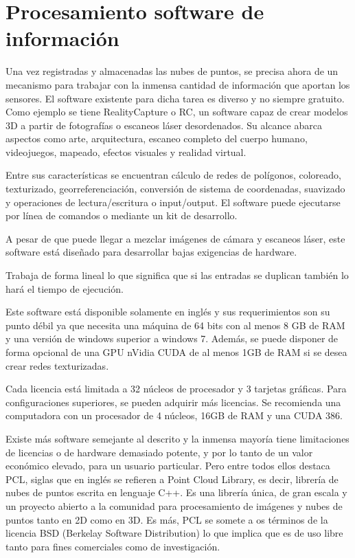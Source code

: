 \section{Procesamiento software de información } \label{librerias}

Una vez registradas y almacenadas las nubes de puntos, se precisa ahora de un mecanismo para trabajar con la inmensa cantidad de información que aportan los sensores. El software existente para dicha tarea es diverso y no siempre gratuito. Como ejemplo se tiene RealityCapture o RC, un software capaz de crear modelos 3D a partir de fotografías o escaneos láser desordenados. Su alcance abarca aspectos como arte, arquitectura, escaneo completo del cuerpo humano, videojuegos, mapeado, efectos visuales y realidad virtual.

Entre sus características se encuentran cálculo de redes de polígonos, coloreado, texturizado, georreferenciación, conversión de sistema de coordenadas, suavizado y operaciones de lectura/escritura o input/output.
El software puede ejecutarse por línea de comandos o mediante un kit de desarrollo.

A pesar de que puede llegar a mezclar imágenes de cámara y escaneos láser, este software está diseñado para desarrollar bajas exigencias de hardware. 

Trabaja de forma lineal lo que significa que si las entradas se duplican también lo hará el tiempo de ejecución.

Este software está disponible solamente en inglés y sus requerimientos son su punto débil ya que necesita una máquina de 64 bits con al menos 8 GB de RAM y una versión de windows superior a windows 7. Además, se puede disponer de forma opcional de una GPU nVidia CUDA de al menos 1GB de RAM si se desea crear redes texturizadas.

Cada licencia está limitada a 32 núcleos de procesador y 3 tarjetas gráficas. Para configuraciones superiores, se pueden adquirir más licencias. Se recomienda una computadora con un procesador de 4 núcleos, 16GB de RAM y una CUDA 386.



Existe más software semejante al descrito y la inmensa mayoría tiene limitaciones de licencias o de hardware demasiado potente, y por lo tanto de un valor económico elevado, para un usuario particular. Pero entre todos ellos destaca PCL, siglas que en inglés se refieren a Point Cloud Library, es decir, librería de nubes de puntos escrita en lenguaje C++. Es una librería única, de gran escala y un proyecto abierto a la comunidad para procesamiento de imágenes y nubes de puntos tanto en 2D como en 3D. Es más, PCL se somete a os términos de la licencia BSD (Berkelay Software Distribution) lo que implica que es de uso libre tanto para fines comerciales como de investigación. 

